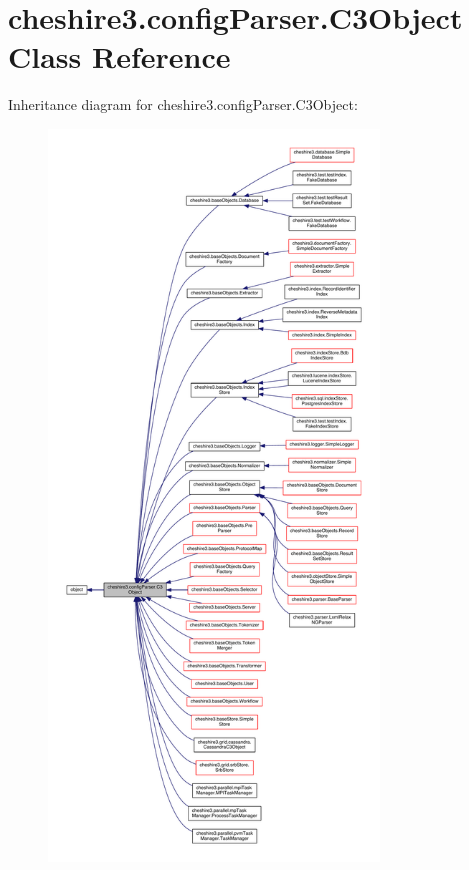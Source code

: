 \hypertarget{classcheshire3_1_1config_parser_1_1_c3_object}{\section{cheshire3.\-config\-Parser.\-C3\-Object Class Reference}
\label{classcheshire3_1_1config_parser_1_1_c3_object}
}


Inheritance diagram for cheshire3.\-config\-Parser.\-C3\-Object\-:
\nopagebreak
\begin{figure}[H]
\begin{center}
\leavevmode
\includegraphics[height=550pt]{classcheshire3_1_1config_parser_1_1_c3_object__inherit__graph}
\end{center}
\end{figure}


